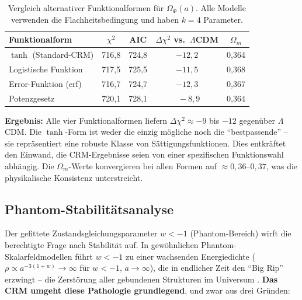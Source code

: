 \documentclass[aps,prd,twocolumn,superscriptaddress,nofootinbib]{revtex4-2}
\begin{document}
\begin{table}[H]
\centering
\caption{Vergleich alternativer Funktionalformen f\"ur $\Omega_\Phi(a)$. Alle Modelle verwenden die Flachheitsbedingung und haben $k=4$ Parameter.}
\label{tab:funcforms}
\begin{tabular}{lcccc}
\toprule
\textbf{Funktionalform} & $\chi^2$ & AIC & $\Delta\chi^2$ vs.\ $\Lambda$CDM & $\Omega_m$ \\
\midrule
$\tanh$ (Standard-CRM) & 716,8 & 724,8 & $-12{,}2$ & 0,364 \\
Logistische Funktion & 717,5 & 725,5 & $-11{,}5$ & 0,368 \\
Error-Funktion (erf) & 716,7 & 724,7 & $-12{,}3$ & 0,367 \\
Potenzgesetz & 720,1 & 728,1 & $\phantom{0}-8{,}9$ & 0,364 \\
\bottomrule
\end{tabular}
\end{table}

\textbf{Ergebnis:} Alle vier Funktionalformen liefern $\Delta\chi^2 \approx -9$ bis $-12$ gegen\"uber $\Lambda$CDM. Die $\tanh$-Form ist weder die einzig m\"ogliche noch die ``bestpassende'' -- sie repr\"asentiert eine robuste Klasse von S\"attigungsfunktionen. Dies entkr\"aftet den Einwand, die CRM-Ergebnisse seien von einer spezifischen Funktionswahl abh\"angig. Die $\Omega_m$-Werte konvergieren bei allen Formen auf $\approx 0{,}36$--$0{,}37$, was die physikalische Konsistenz unterstreicht.

\subsection{Phantom-Stabilit\"atsanalyse}
\label{subsec:phantom}

Der gefittete Zustandsgleichungsparameter $w < -1$ (Phantom-Bereich) wirft die berechtigte Frage nach Stabilit\"at auf. In gew\"ohnlichen Phantom-Skalarfeldmodellen f\"uhrt $w < -1$ zu einer wachsenden Energiedichte ($\rho \propto a^{-3(1+w)} \to \infty$ f\"ur $w < -1$, $a \to \infty$), die in endlicher Zeit den ``Big Rip'' erzwingt -- die Zerst\"orung aller gebundenen Strukturen im Universum \cite{Caldwell1998}. \textbf{Das CRM umgeht diese Pathologie grundlegend}, und zwar aus drei Gr\"unden:
\end{document}
